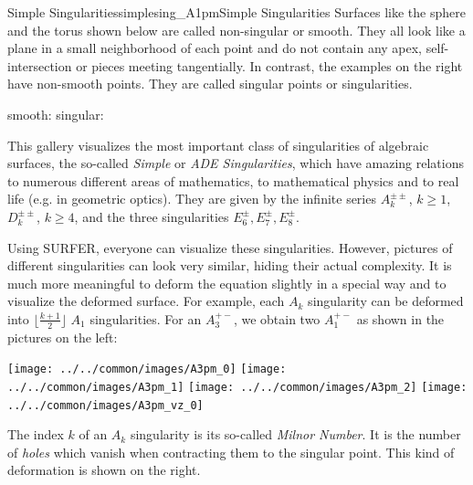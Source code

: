 \begin{surferIntroPage}{Simple Singularities}{simplesing_A1pm}{Simple Singularities}
	Surfaces like the sphere and the torus shown below are called non-singular or smooth. They all look like a plane in a small neighborhood of each point and do not contain any apex, self-intersection or pieces meeting tangentially. In contrast, the examples on the right have non-smooth points. They are called singular points or singularities.
	\begin{center}%
		smooth:\enspace%
		\quad%
		singular:%
	\end{center}
	This gallery visualizes the most important class of singularities of algebraic surfaces, the so-called \emph{Simple} or \emph{ADE Singularities}, which have amazing relations to numerous different areas of mathematics, to mathematical physics and to real life (e.g. in geometric optics). They are given by the infinite series $A_k^{\pm\pm}\!$, $k\geq 1$, $D_k^{\pm\pm}\!$, $k\geq 4$, and the three singularities $E^\pm_6\!, E^\pm_7\!, E^\pm_8\!$.

	Using SURFER, everyone can visualize these singularities. However, pictures of different singularities can look very similar, hiding their actual complexity. It is much more meaningful to deform the equation slightly in a special way and to visualize the deformed surface. For example, each $A_k$ singularity can be deformed into $\lfloor\frac{k+1}{2}\rfloor$ $A_1$ singularities. For an $A_3^{+-}$, we obtain two $A_1^{+-}$ as shown in the pictures on the left:
	\vspace{-0.2cm}
	\begin{center}%
		\texttt{[image: ../../common/images/A3pm\_0]}\enspace%
		\texttt{[image: ../../common/images/A3pm\_1]}\enspace%
		\texttt{[image: ../../common/images/A3pm\_2]}\enspace%
		\qquad\quad%
		\enspace%
		\enspace%
		\texttt{[image: ../../common/images/A3pm\_vz\_0]}
	\end{center}
	\vspace{-0.2cm}
	The index $k$ of an $A_k$ singularity is its so-called \emph{Milnor Number}. It is the number of \emph{holes} which vanish when contracting them to the singular point. This kind of deformation is shown on the right.
\end{surferIntroPage}
